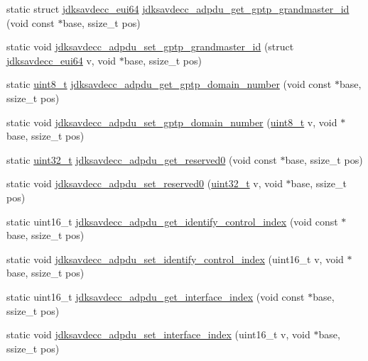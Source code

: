 \begin{DoxyCompactItemize}
static struct \hyperlink{structjdksavdecc__eui64}{jdksavdecc\+\_\+eui64} \hyperlink{group__adpdu_ga43b71d01d07b468523243f5a0d198094}{jdksavdecc\+\_\+adpdu\+\_\+get\+\_\+gptp\+\_\+grandmaster\+\_\+id} (void const $\ast$base, ssize\+\_\+t pos)
\item 
static void \hyperlink{group__adpdu_ga69792f231564786261d00109e34f9623}{jdksavdecc\+\_\+adpdu\+\_\+set\+\_\+gptp\+\_\+grandmaster\+\_\+id} (struct \hyperlink{structjdksavdecc__eui64}{jdksavdecc\+\_\+eui64} v, void $\ast$base, ssize\+\_\+t pos)
\item 
static \hyperlink{stdint_8h_aba7bc1797add20fe3efdf37ced1182c5}{uint8\+\_\+t} \hyperlink{group__adpdu_ga30d6895c799763e1db472ac028ff2866}{jdksavdecc\+\_\+adpdu\+\_\+get\+\_\+gptp\+\_\+domain\+\_\+number} (void const $\ast$base, ssize\+\_\+t pos)
\item 
static void \hyperlink{group__adpdu_ga085c2da55db6ab9c3a55135585bd8f09}{jdksavdecc\+\_\+adpdu\+\_\+set\+\_\+gptp\+\_\+domain\+\_\+number} (\hyperlink{stdint_8h_aba7bc1797add20fe3efdf37ced1182c5}{uint8\+\_\+t} v, void $\ast$base, ssize\+\_\+t pos)
\item 
static \hyperlink{parse_8c_a6eb1e68cc391dd753bc8ce896dbb8315}{uint32\+\_\+t} \hyperlink{group__adpdu_ga2031c88944f0ac9bb7acbef84317c67f}{jdksavdecc\+\_\+adpdu\+\_\+get\+\_\+reserved0} (void const $\ast$base, ssize\+\_\+t pos)
\item 
static void \hyperlink{group__adpdu_gae94258bc6f68ece2c34df783d72a32cf}{jdksavdecc\+\_\+adpdu\+\_\+set\+\_\+reserved0} (\hyperlink{parse_8c_a6eb1e68cc391dd753bc8ce896dbb8315}{uint32\+\_\+t} v, void $\ast$base, ssize\+\_\+t pos)
\item 
static uint16\+\_\+t \hyperlink{group__adpdu_gafb99f55db66cfcb0879860f0fe4b329f}{jdksavdecc\+\_\+adpdu\+\_\+get\+\_\+identify\+\_\+control\+\_\+index} (void const $\ast$base, ssize\+\_\+t pos)
\item 
static void \hyperlink{group__adpdu_ga8f13fff0b0e17122809c6fb2f089c1c2}{jdksavdecc\+\_\+adpdu\+\_\+set\+\_\+identify\+\_\+control\+\_\+index} (uint16\+\_\+t v, void $\ast$base, ssize\+\_\+t pos)
\item 
static uint16\+\_\+t \hyperlink{group__adpdu_gac8a8b6bfc95370b68dfd1f5bfd335ae2}{jdksavdecc\+\_\+adpdu\+\_\+get\+\_\+interface\+\_\+index} (void const $\ast$base, ssize\+\_\+t pos)
\item 
static void \hyperlink{group__adpdu_ga651dcd9fd5b18884b0b86d0c8d32b3ec}{jdksavdecc\+\_\+adpdu\+\_\+set\+\_\+interface\+\_\+index} (uint16\+\_\+t v, void $\ast$base, ssize\+\_\+t pos)

\end{DoxyCompactItemize}
